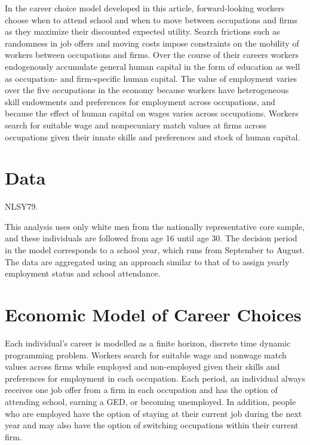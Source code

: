 \documentclass[12pt]{article}
\theoremstyle{definition}
\begin{document}
In the career choice model developed in this article, forward-looking workers choose when to attend school and when to move between occupations and firms as they maximize their discounted expected utility. Search frictions such as randomness in job offers and moving costs impose constraints on the mobility of workers between occupations and firms. Over the course of their careers workers endogenously accumulate general human capital in the form of education as well as occupation- and firm-specific human capital. The value of employment varies over the five occupations in the economy because workers have heterogeneous skill endowments and preferences for employment across occupations, and because the effect of human capital on wages varies across occupations. Workers search for suitable wage and nonpecuniary match values at firms across occupations given their innate skills and preferences and stock of human capital.



\section{Data}

NLSY79.

This analysis uses only white men from the nationally representative core sample, and these individuals are followed from age 16 until age 30. The decision period in the model corresponds to a school year, which runs from September to August. The data are aggregated using an approach similar to that of \citet{keaneCareerDecisionsYoung1997} to assign yearly employment status and school attendance. 


\section{Economic Model of Career Choices}

Each individual's career is modelled as a finite horizon, discrete time dynamic programming problem. Workers search for suitable wage and nonwage match values across firms while employed and non-employed given their skills and preferences for employment in each occupation. Each period, an individual always receives one job offer from a firm in each occupation and has the option of attending school, earning a GED, or becoming unemployed. In addition, people who are employed have the option of staying at their current job during the next year and may also have the option of switching occupations within their current firm. 
\end{document}
